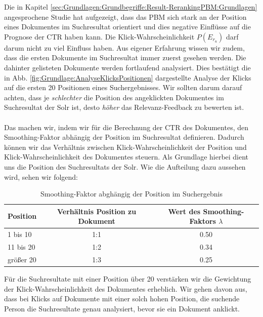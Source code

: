 Die in Kapitel \ref{sec:Grundlagen:Grundbegriffe:Result-RerankingPBM:Grundlagen} angesprochene Studie \cite{pbm} hat aufgezeigt, dass das PBM sich stark an der Position eines Dokumentes im Suchresultat orientiert und dies negative Einflüsse auf die Prognose der CTR haben kann. Die Klick-Wahrscheinlichkeit $P(E_{r_{u}})$ darf darum nicht zu viel Einfluss haben. Aus eigener Erfahrung wissen wir zudem, dass die ersten Dokumente im Suchresultat immer zuerst gesehen werden. Die dahinter gelisteten Dokumente werden fortlaufend analysiert. Dies bestätigt die in Abb. \ref{fig:Grundlage:AnalyseKlicksPositionen} dargestellte Analyse der Klicks auf die ersten 20 Positionen eines Suchergebnisses. Wir sollten darum darauf achten, dass je \textit{schlechter} die Position des angeklickten Dokumentes im Suchresultat der Solr ist, desto \textit{höher} das Relevanz-Feedback zu bewerten ist. 
\\
\\
Das machen wir, indem wir für die Berechnung der CTR des Dokumentes, den Smoothing-Faktor abhängig der Position im Suchresultat definieren. Dadurch können wir das Verhältnis zwischen Klick-Wahrscheinlichkeit der Position und Klick-Wahrscheinlichkeit des Dokumentes steuern. Als Grundlage hierbei dient uns die Position des Suchresultats der Solr. Wie die Aufteilung dazu aussehen wird, sehen wir folgend:

\begin{table}[H]
\centering
\vspace{-.75em}
 \caption[Smoothing-Faktor abghängig der Position im Suchergebnis]{Smoothing-Faktor abghängig der Position im Suchergebnis}
\label{tab:VerhaeltnisKlick-WahrscheinlichkeitenPositionDokument}
\vspace{-.5em}
\footnotesize
\renewcommand*{\arraystretch}{1.2}
\begin{tabular}{lcc} \hline
	\textbf{Position} & \textbf{Verhältnis Position zu Dokument} & \textbf{Wert des Smoothing-Faktors $\lambda$}\\ \hline
	1 bis 10 & 1:1 & 0.50\\ \hline
	11 bis 20 & 1:2 & 0.34\\ \hline
	größer 20 &  1:3 & 0.25\\ \hline
 \end{tabular}
\vspace{-2em}
\end{table}

Für die Suchresultate mit einer Position über 20 verstärken wir die Gewichtung der Klick-Wahrscheinlichkeit des Dokumentes erheblich. Wir gehen davon aus, dass bei Klicks auf Dokumente mit einer solch hohen Position, die suchende Person die Suchresultate genau analysiert, bevor sie ein Dokument anklickt.

